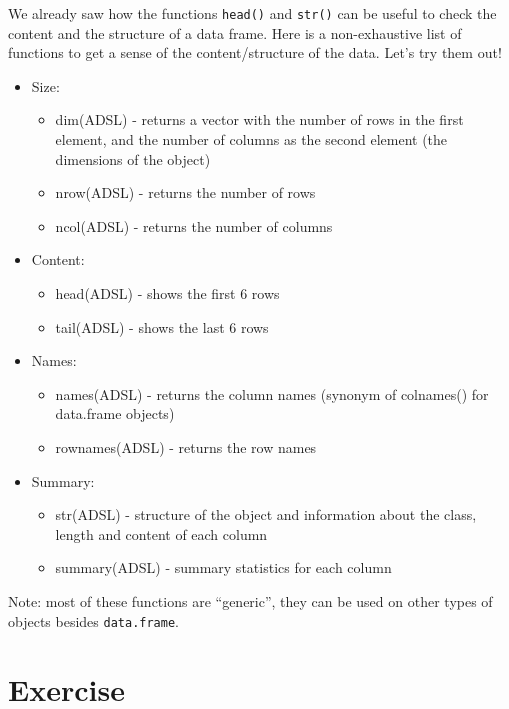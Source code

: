 \documentclass[]{book}
\providecommand{\tightlist}{%
  \setlength{\itemsep}{0pt}\setlength{\parskip}{0pt}}
\begin{document}
We already saw how the functions \texttt{head()} and \texttt{str()} can be useful to check the content and the structure of a data frame. Here is a non-exhaustive list of functions to get a sense of the content/structure of the data. Let's try them out!

\begin{itemize}
\tightlist
\item
  Size:

  \begin{itemize}
  \tightlist
  \item
    dim(ADSL) - returns a vector with the number of rows in the first element, and the number of columns as the second element (the dimensions of the object)
  \item
    nrow(ADSL) - returns the number of rows
  \item
    ncol(ADSL) - returns the number of columns
  \end{itemize}
\item
  Content:

  \begin{itemize}
  \tightlist
  \item
    head(ADSL) - shows the first 6 rows
  \item
    tail(ADSL) - shows the last 6 rows
  \end{itemize}
\item
  Names:

  \begin{itemize}
  \tightlist
  \item
    names(ADSL) - returns the column names (synonym of colnames() for data.frame objects)
  \item
    rownames(ADSL) - returns the row names
  \end{itemize}
\item
  Summary:

  \begin{itemize}
  \tightlist
  \item
    str(ADSL) - structure of the object and information about the class, length and content of each column
  \item
    summary(ADSL) - summary statistics for each column
  \end{itemize}
\end{itemize}

Note: most of these functions are ``generic'', they can be used on other types of objects besides \texttt{data.frame}.

\hypertarget{exercise-1}{%
\section{Exercise}\label{exercise-1}}
\end{document}
